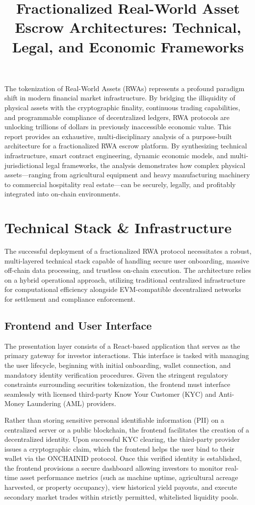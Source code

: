 \documentclass[12pt, a4paper]{article}
\title{Fractionalized Real-World Asset Escrow Architectures: Technical, Legal, and Economic Frameworks}
\author{}
\date{}
\begin{document}
\maketitle

The tokenization of Real-World Assets (RWAs) represents a profound paradigm shift in modern financial market infrastructure. By bridging the illiquidity of physical assets with the cryptographic finality, continuous trading capabilities, and programmable compliance of decentralized ledgers, RWA protocols are unlocking trillions of dollars in previously inaccessible economic value. This report provides an exhaustive, multi-disciplinary analysis of a purpose-built architecture for a fractionalized RWA escrow platform. By synthesizing technical infrastructure, smart contract engineering, dynamic economic models, and multi-jurisdictional legal frameworks, the analysis demonstrates how complex physical assets—ranging from agricultural equipment and heavy manufacturing machinery to commercial hospitality real estate—can be securely, legally, and profitably integrated into on-chain environments.

\section{Technical Stack \& Infrastructure}
The successful deployment of a fractionalized RWA protocol necessitates a robust, multi-layered technical stack capable of handling secure user onboarding, massive off-chain data processing, and trustless on-chain execution. The architecture relies on a hybrid operational approach, utilizing traditional centralized infrastructure for computational efficiency alongside EVM-compatible decentralized networks for settlement and compliance enforcement.

\subsection{Frontend and User Interface}
The presentation layer consists of a React-based application that serves as the primary gateway for investor interactions. This interface is tasked with managing the user lifecycle, beginning with initial onboarding, wallet connection, and mandatory identity verification procedures. Given the stringent regulatory constraints surrounding securities tokenization, the frontend must interface seamlessly with licensed third-party Know Your Customer (KYC) and Anti-Money Laundering (AML) providers.

Rather than storing sensitive personal identifiable information (PII) on a centralized server or a public blockchain, the frontend facilitates the creation of a decentralized identity. Upon successful KYC clearing, the third-party provider issues a cryptographic claim, which the frontend helps the user bind to their wallet via the ONCHAINID protocol. Once this verified identity is established, the frontend provisions a secure dashboard allowing investors to monitor real-time asset performance metrics (such as machine uptime, agricultural acreage harvested, or property occupancy), view historical yield payouts, and execute secondary market trades within strictly permitted, whitelisted liquidity pools.
\end{document}
